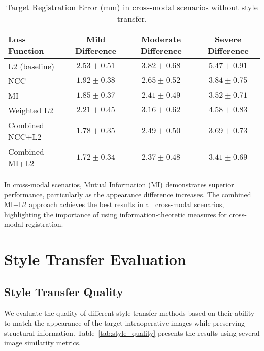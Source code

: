 \begin{table}[htpb]
  \caption[Target Registration Error in cross-modal scenarios]{Target Registration Error (mm) in cross-modal scenarios without style transfer.}\label{tab:loss_cross_modal}
  \centering
  \begin{tabular}{l c c c}
    \toprule
      Loss Function & Mild Difference & Moderate Difference & Severe Difference \\
    \midrule
      L2 (baseline) & $2.53 \pm 0.51$ & $3.82 \pm 0.68$ & $5.47 \pm 0.91$ \\
      NCC & $1.92 \pm 0.38$ & $2.65 \pm 0.52$ & $3.84 \pm 0.75$ \\
      MI & $1.85 \pm 0.37$ & $2.41 \pm 0.49$ & $3.52 \pm 0.71$ \\
      Weighted L2 & $2.21 \pm 0.45$ & $3.16 \pm 0.62$ & $4.58 \pm 0.83$ \\
      Combined NCC+L2 & $1.78 \pm 0.35$ & $2.49 \pm 0.50$ & $3.69 \pm 0.73$ \\
      Combined MI+L2 & $\mathbf{1.72 \pm 0.34}$ & $\mathbf{2.37 \pm 0.48}$ & $\mathbf{3.41 \pm 0.69}$ \\
    \bottomrule
  \end{tabular}
\end{table}

In cross-modal scenarios, Mutual Information (MI) demonstrates superior performance, particularly as the appearance difference increases. The combined MI+L2 approach achieves the best results in all cross-modal scenarios, highlighting the importance of using information-theoretic measures for cross-modal registration.

\section{Style Transfer Evaluation}

\subsection{Style Transfer Quality}

We evaluate the quality of different style transfer methods based on their ability to match the appearance of the target intraoperative images while preserving structural information. Table~\ref{tab:style_quality} presents the results using several image similarity metrics.

